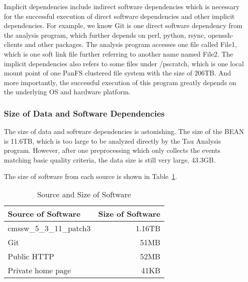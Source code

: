 \documentclass{acm_proc_article-sp}
\begin{document}
Implicit dependencies include indirect software
dependencies which is necessary for the successful execution of direct software
dependencies and other implicit dependencies. For example, we know Git is one
direct software dependency from the analysis program, which further depends on
perl, python, rsync, openssh-clients and other packages. The analysis program
accesses one file called File1, which is one soft link file further referring to
another name named File2.
The implicit dependencies also refers to some files under /pscratch, which is one local mount point of one PanFS clustered file system with the size of 206TB.
And more importantly, the successful execution of this program greatly depends on the underlying OS and hardware platform.


\subsubsection{Size of Data and Software Dependencies}
The size of data and software dependencies is astonishing.
The size of the BEAN is 11.6TB, which is too large to be analyzed directly by the Tau Analysis program. However, after one preprocessing which only collects the events matching basic quality criteria, the data size is still very large, 43.3GB. 

The size of software from each source is shown in Table~\ref{table:software-source-size}.

\begin{table}
    \centering
    \begin{tabular}{|l|r|}
        \hline
        Source of Software & Size of Software \\ \hline
        cmssw\_5\_3\_11\_patch3 & 1.16TB \\ \hline
        Git & 51MB \\ \hline
        Public HTTP & 52MB \\ \hline
        Private home page & 41KB \\ \hline
    \end{tabular}
    \caption{Source and Size of Software}
    \label{table:software-source-size}
\end{table}
\end{document}
